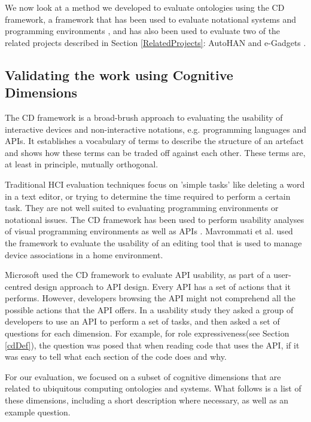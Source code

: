 We now look at a method we developed to evaluate ontologies using the \ac{CD} framework, a framework that has been used to evaluate notational systems and programming environments \cite{Green1996}, and has also been used to evaluate two of the related projects described in Section \ref{RelatedProjects}: AutoHAN \cite{Blackwell2001} and e-Gadgets \cite{Mavrommati2004}.

\subsection{Validating the work using Cognitive Dimensions}
\label{CognitiveDimensions}

The \ac{CD} framework is a broad-brush approach to evaluating the usability of interactive devices and non-interactive notations, e.g. programming languages and \acp{API}. It establishes a vocabulary of terms to describe the structure of an artefact and shows how these terms can be traded off against each other. These terms are, at least in principle, mutually orthogonal.

Traditional HCI evaluation techniques focus on 'simple tasks' like deleting a word in a text editor, or trying to determine the time required to perform a certain task. They are not well suited to evaluating programming environments or notational issues. The \ac{CD} framework has been used to perform usability analyses of visual programming environments \cite{Green1996} as well as \acp{API} \cite{Clarke2004}. Mavrommati et al. \cite{Mavrommati2004} used the framework to evaluate the usability of an editing tool that is used to manage device associations in a home environment.

Microsoft \cite{Clarke2004} used the \ac{CD} framework to evaluate \ac{API} usability, as part of a user-centred design approach to \ac{API} design. Every \ac{API} has a set of actions that it performs. However, developers browsing the \ac{API} might not comprehend all the possible actions that the \ac{API} offers. In a usability study they asked a group of developers to use an API to perform a set of tasks, and then asked a set of questions for each dimension. For example, for role expressiveness(see Section \ref{cdDef}), the question was posed that when reading code that uses the \ac{API}, if it was easy to tell what each section of the code does and why.

For our evaluation, we focused on a subset of cognitive dimensions that are related to ubiquitous computing ontologies and systems. What follows is a list of these dimensions, including a short description where necessary, as well as an example question.


